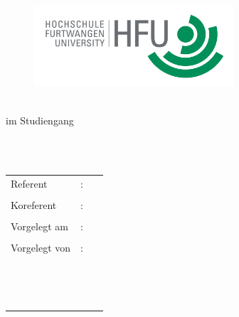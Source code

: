 \begin{titlepage}
\pagestyle{empty}

\begin{flushright}
\begin{figure}[ht]
\flushright
\includegraphics[height=3cm]{content/pictures/HFU_Logo.jpg}
\end{figure}
\end{flushright}

\begin{center}
{\fontsize{18}{22} \selectfont \docArtDerArbeit}\\[5mm]
{\fontsize{18}{22} \selectfont im Studiengang} \\[5mm]
{\fontsize{18}{22} \selectfont \docStudiengang}\\
\vspace{1cm}
\begin{onehalfspace}
{\fontsize{22}{26} \selectfont \textbf{\docTitle}}\\[5mm]
{\fontsize{18}{22} \selectfont \docUntertitle}


\end{onehalfspace}
\end{center}

\vfill
\begin{center}
\begin{tabular}{lcl}
Referent  		&:& \docErsterReferent 	\\ \\
Koreferent 		&:& \docZweiterReferent \\ \\	
Vorgelegt am 	&:& \docAbgabedatum 	\\ \\
Vorgelegt von 	&:& \docVornameEins~\docNachnameEins\\
				& & \docVornameZwei~\docNachnameZwei\\
				& & \docVornameDrei~\docNachnameDrei\\
				& & \docVornameVier~\docNachnameVier			
\end{tabular}
\end{center}
\end{titlepage}